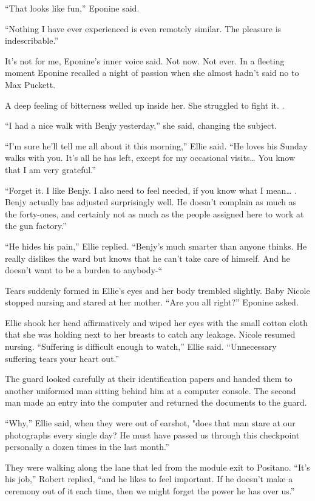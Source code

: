 \documentclass[]{article}
\begin{document}
{{“That looks like fun,” Eponine said.

“Nothing I have ever experienced is even remotely similar.  The pleasure is indescribable.”

It’s not for me, Eponine’s inner voice said.  Not now.  Not ever.  In a fleeting moment Eponine recalled a night of passion when she almost hadn’t said no to Max Puckett.

A deep feeling of bitterness welled up inside her.  She struggled to fight it.  .

“I had a nice walk with Benjy yesterday,” she said, changing the subject.

“I’m sure he’ll tell me all about it this morning,” Ellie said.  “He loves his Sunday walks with you.  It’s all he has left, except for my occasional visits…  You know that I am very grateful.”

“Forget it.  I like Benjy.  I also need to feel needed, if you know what I mean… .  Benjy actually has adjusted surprisingly well.  He doesn’t complain as much as the forty-ones, and certainly not as much as the people assigned here to work at the gun factory.”

“He hides his pain,” Ellie replied.  “Benjy’s much smarter than anyone thinks.  He really dislikes the ward but knows that he can’t take care of himself.  And he doesn’t want to be a burden to anybody-“

Tears suddenly formed in Ellie’s eyes and her body trembled slightly.  Baby Nicole stopped nursing and stared at her mother.  “Are you all right?” Eponine asked.

Ellie shook her head affirmatively and wiped her eyes with the small cotton cloth that she was holding next to her breasts to catch any leakage.  Nicole resumed nursing.  “Suffering is difficult enough to watch,” Ellie said.  “Unnecessary suffering tears your heart out.”

The guard looked carefully at their identification papers and handed them to another uniformed man sitting behind him at a computer console.  The second man made an entry into the computer and returned the documents to the guard.

“Why,” Ellie said, when they were out of earshot, "does that man stare at our photographs every single day? He must have passed us through this checkpoint personally a dozen times in the last month.”

They were walking along the lane that led from the module exit to Positano.  “It’s his job,” Robert replied, “and he likes to feel important.  If he doesn’t make a ceremony out of it each time, then we might forget the power he has over us.”

}}
\end{document}
